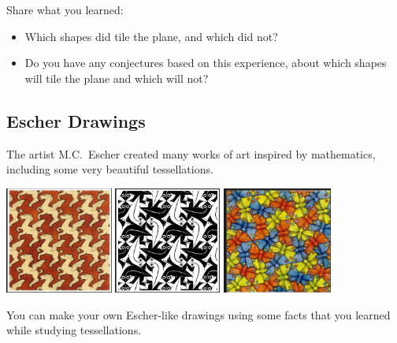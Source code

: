 \bigskip
\bigskip


\begin{thinkpair*}
Share what you learned: 
\begin{itemize}
\item
Which shapes did tile the plane, and which did not?  \\

\item
Do you have any conjectures based on this experience, about which shapes will tile the plane and which will not?
\end{itemize}
\end{thinkpair*}


\newpage


\subsection{Escher Drawings}
The artist M.C.~Escher created many works of art inspired by mathematics, including some very beautiful tessellations.

\begin{center}
\includegraphics[height=3.5cm]{escher1}
\quad
\includegraphics[height=3.5cm]{escher2}
\quad
\includegraphics[height=3.5cm]{escher4}

\end{center}
You can make your own Escher-like drawings using some facts that you learned while studying tessellations.

